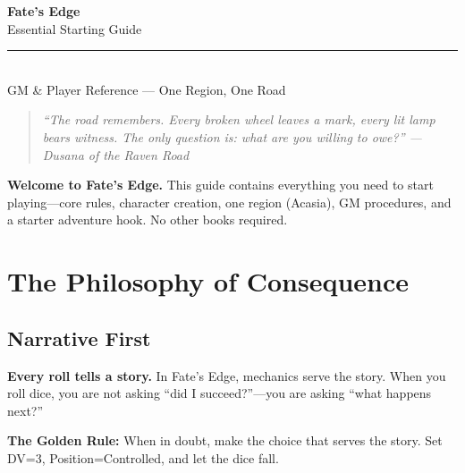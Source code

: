 \documentclass[10pt,twocolumn]{article} %
\begin{document}

\begin{center}
    {\Huge\bfseries\sffamily\color{edgered} Fate's Edge}\\[0.2em]
    {\large\sffamily Essential Starting Guide}\\[0.5em]
    \rule{0.7\textwidth}{0.5pt}\\[0.8em]
    {\large\sffamily GM \& Player Reference --- One Region, One Road}\\[1em]
    \begin{quote}
        \itshape ``The road remembers. Every broken wheel leaves a mark, every lit lamp bears witness. The only question is: what are you willing to owe?''
        \hfill --- Dusana of the Raven Road
    \end{quote}
    \begin{sidebar}
        \textbf{Welcome to Fate's Edge.} This guide contains everything you need to start playing---core rules, character creation, one region (Acasia), GM procedures, and a starter adventure hook. No other books required.
    \end{sidebar}
\end{center}
\vspace{1em}

\section{The Philosophy of Consequence}

\subsection{Narrative First}
\textbf{Every roll tells a story.} In Fate's Edge, mechanics serve the story. When you roll dice, you are not asking ``did I succeed?''---you are asking ``what happens next?''

\begin{sidebar}
    \textbf{The Golden Rule:} When in doubt, make the choice that serves the story. Set DV=3, Position=Controlled, and let the dice fall.
\end{sidebar}
\end{document}
